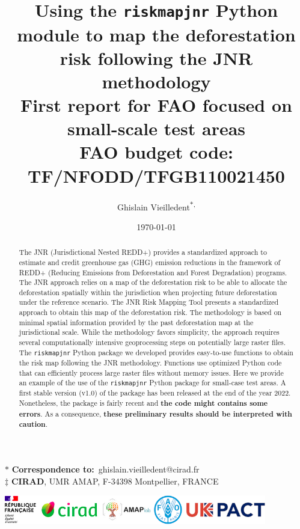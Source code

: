 \documentclass[paper=a4, 12pt, DIV=12]{scrartcl}
\author{Ghislain Vieilledent\textsuperscript{\(\ast\), \ddag{}}}
\date{\today}
\title{Using the \texttt{riskmapjnr} Python module to map the deforestation risk following the JNR methodology\\\medskip
\large \textcolor{pnasblue}{First report for FAO focused on small-scale test areas\\ FAO budget code: TF/NFODD/TFGB110021450}}
\begin{document}
\maketitle

\vspace{-1cm}
\begin{center}
  $\ast$ \textbf{Correspondence to:}~ghislain.vieilledent@cirad.fr \\
  $\ddag$ \textbf{CIRAD}, UMR AMAP, F-34398 Montpellier, FRANCE \\
\end{center}
\vspace{0.25cm}

\begin{abstract}
The JNR (Jurisdictional Nested REDD+) provides a standardized approach to estimate and credit greenhouse gas (GHG) emission reductions in the framework of REDD+ (Reducing Emissions from Deforestation and Forest Degradation) programs. The JNR approach relies on a map of the deforestation risk to be able to allocate the deforestation spatially within the jurisdiction when projecting future deforestation under the reference scenario. The JNR Risk Mapping Tool presents a standardized approach to obtain this map of the deforestation risk. The methodology is based on minimal spatial information provided by the past deforestation map at the jurisdictional scale. While the methodology favors simplicity, the approach requires several computationally intensive geoprocessing steps on potentially large raster files. The \texttt{riskmapjnr} Python package we developed provides easy-to-use functions to obtain the risk map following the JNR methodology. Functions use optimized Python code that can efficiently process large raster files without memory issues. Here we provide an example of the use of the \texttt{riskmapjnr} Python package for small-case test areas. A first stable version (v1.0) of the package has been released at the end of the year 2022. Nonetheless, the package is fairly recent and \textbf{the code might contains some errors}. As a consequence, \textbf{these preliminary results should be interpreted with caution}.
\end{abstract}

\vspace{0.25cm}
\begin{center}
\includegraphics[width=0.86\textwidth]{images/partners_logos.png}\enlargethispage{2\baselineskip}
\end{center}
\newpage
\tableofcontents
\newpage
\listoffigures
\newpage
\end{document}
